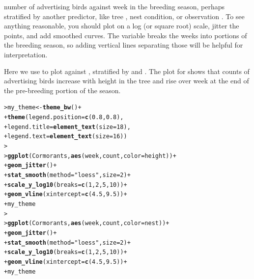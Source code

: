 \documentclass[10pt]{report}\usepackage[]{graphicx}\usepackage[]{color}
\makeatletter
\newcommand{\hlnum}[1]{\textcolor[rgb]{0.686,0.059,0.569}{#1}}%
\newcommand{\hlstr}[1]{\textcolor[rgb]{0.192,0.494,0.8}{#1}}%
\newcommand{\hlopt}[1]{\textcolor[rgb]{0,0,0}{#1}}%
\newcommand{\hlstd}[1]{\textcolor[rgb]{0.345,0.345,0.345}{#1}}%
\newcommand{\hlkwb}[1]{\textcolor[rgb]{0.69,0.353,0.396}{#1}}%
\newcommand{\hlkwc}[1]{\textcolor[rgb]{0.333,0.667,0.333}{#1}}%
\newcommand{\hlkwd}[1]{\textcolor[rgb]{0.737,0.353,0.396}{\textbf{#1}}}%
\newenvironment{kframe}{%
 \def\at@end@of@kframe{}%
 \ifinner\ifhmode%
  \def\at@end@of@kframe{\end{minipage}}%
  \begin{minipage}{\columnwidth}%
 \fi\fi%
 \def\FrameCommand##1{\hskip\@totalleftmargin \hskip-\fboxsep
 \colorbox{shadecolor}{##1}\hskip-\fboxsep
     \hskip-\linewidth \hskip-\@totalleftmargin \hskip\columnwidth}%
 \MakeFramed {\advance\hsize-\width
   \@totalleftmargin\z@ \linewidth\hsize
   \@setminipage}}%
 {\par\unskip\endMakeFramed%
 \at@end@of@kframe}
\newenvironment{knitrout}{}{} %
\renewenvironment{knitrout}{\small\renewcommand{\baselinestretch}{.85}}{} %
\makeatother
\begin{document}
\begin{Exercises}
\begin{enumerate*}
		number of advertising birds against week in the breeding season, perhaps stratified
		by another predictor, like tree , nest condition, or observation
		. 
		To see anything reasonable,
		you should plot  on a log (or square root) scale, jitter the points, and add
		smoothed curves. The variable  breaks the weeks into portions of the
		breeding season, so adding vertical lines separating those will be helpful for interpretation.
		\begin{ans}
		Here we use  to plot  against , stratified by 
		and .
		The plot for  shows that counts of advertising birds increase with height in the
		tree and rise over week at the end of the pre-breeding portion of the season.
\begin{knitrout}\footnotesize
{}\color{fgcolor}\begin{kframe}
\begin{alltt}
\hlstd{> }\hlstd{my_theme} \hlkwb{<-} \hlkwd{theme_bw}\hlstd{()} \hlopt{+}
\hlstd{+ }            \hlkwd{theme}\hlstd{(}\hlkwc{legend.position} \hlstd{=} \hlkwd{c}\hlstd{(}\hlnum{0.8}\hlstd{,} \hlnum{0.8}\hlstd{),}
\hlstd{+ }                  \hlkwc{legend.title} \hlstd{=} \hlkwd{element_text}\hlstd{(}\hlkwc{size}\hlstd{=}\hlnum{18}\hlstd{),}
\hlstd{+ }                  \hlkwc{legend.text} \hlstd{=} \hlkwd{element_text}\hlstd{(}\hlkwc{size}\hlstd{=}\hlnum{16}\hlstd{))}
\hlstd{> }	 
\hlstd{> }\hlkwd{ggplot}\hlstd{(Cormorants,} \hlkwd{aes}\hlstd{(week, count,} \hlkwc{color}\hlstd{=height))} \hlopt{+}
\hlstd{+ }  \hlkwd{geom_jitter}\hlstd{()} \hlopt{+}
\hlstd{+ }        \hlkwd{stat_smooth}\hlstd{(}\hlkwc{method}\hlstd{=}\hlstr{"loess"}\hlstd{,} \hlkwc{size}\hlstd{=}\hlnum{2}\hlstd{)} \hlopt{+}
\hlstd{+ }        \hlkwd{scale_y_log10}\hlstd{(}\hlkwc{breaks}\hlstd{=}\hlkwd{c}\hlstd{(}\hlnum{1}\hlstd{,}\hlnum{2}\hlstd{,}\hlnum{5}\hlstd{,}\hlnum{10}\hlstd{))} \hlopt{+}
\hlstd{+ }        \hlkwd{geom_vline}\hlstd{(}\hlkwc{xintercept}\hlstd{=}\hlkwd{c}\hlstd{(}\hlnum{4.5}\hlstd{,} \hlnum{9.5}\hlstd{))} \hlopt{+}
\hlstd{+ }        \hlstd{my_theme}
\hlstd{> }
\hlstd{> }\hlkwd{ggplot}\hlstd{(Cormorants,} \hlkwd{aes}\hlstd{(week, count,} \hlkwc{color}\hlstd{=nest))} \hlopt{+}
\hlstd{+ }  \hlkwd{geom_jitter}\hlstd{()} \hlopt{+}
\hlstd{+ }  \hlkwd{stat_smooth}\hlstd{(}\hlkwc{method}\hlstd{=}\hlstr{"loess"}\hlstd{,} \hlkwc{size}\hlstd{=}\hlnum{2}\hlstd{)} \hlopt{+}
\hlstd{+ }  \hlkwd{scale_y_log10}\hlstd{(}\hlkwc{breaks}\hlstd{=}\hlkwd{c}\hlstd{(}\hlnum{1}\hlstd{,}\hlnum{2}\hlstd{,}\hlnum{5}\hlstd{,}\hlnum{10}\hlstd{))} \hlopt{+}
\hlstd{+ }  \hlkwd{geom_vline}\hlstd{(}\hlkwc{xintercept}\hlstd{=}\hlkwd{c}\hlstd{(}\hlnum{4.5}\hlstd{,} \hlnum{9.5}\hlstd{))} \hlopt{+}
\hlstd{+ }  \hlstd{my_theme}
\end{alltt}
\end{kframe}


\end{knitrout}
\end{ans}
\end{enumerate*}
\end{Exercises}
\end{document}
